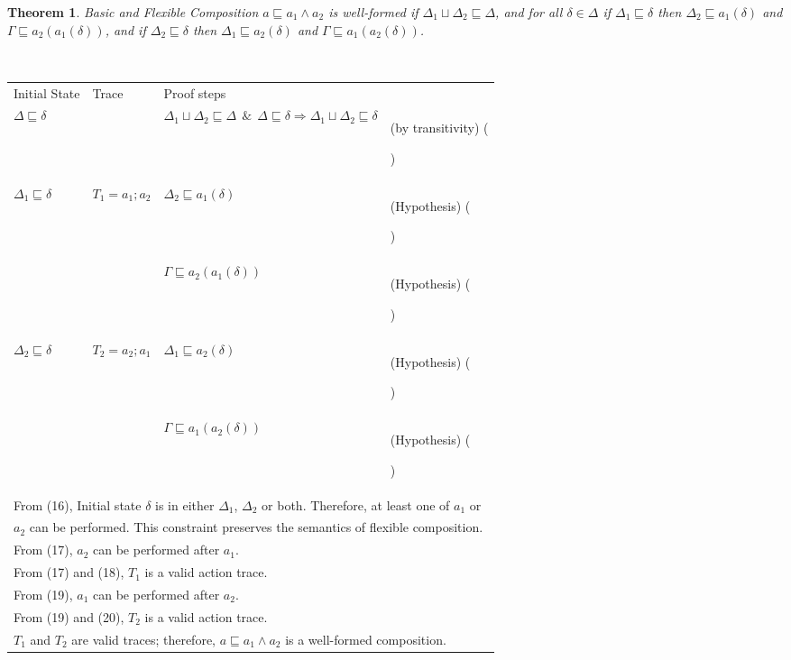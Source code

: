 \documentclass[12pt,journal,letterpaper,onecolumn]{IEEEtran}
\newcounter{myCounter}
\renewcommand{\themyCounter}{\arabic{myCounter}\addtocounter{myCounter}{1}}
\newtheorem{theorem}{Theorem}[section]
\begin{document}
\begin{theorem}
Basic and Flexible Composition $a\sqsubseteq a_1 \wedge a_2$ is
well-formed if $ \Delta_1 \sqcup \Delta_2 \sqsubseteq \Delta$, and
for all $\delta \in \Delta$ if $\Delta_1 \sqsubseteq \delta$ then $
\Delta_2 \sqsubseteq a_1(\delta)$ and $\Gamma \sqsubseteq
a_2(a_1(\delta))$, and if $ \Delta_2 \sqsubseteq \delta$ then
$\Delta_1 \sqsubseteq a_2(\delta)$ and $\Gamma \sqsubseteq
a_1(a_2(\delta))$.\label{theorem:basicflexibleconjunction}
\end{theorem}
\\
\begin{minipage}{6in} \begin{center}
\begin{tabular}{llp{7.5cm}p{3.8cm}}
Initial State & Trace &  Proof steps & \\
$\Delta \sqsubseteq \delta$ &  & $\Delta_1 \sqcup \Delta_2 \sqsubseteq \Delta ~~\&~~ \Delta \sqsubseteq \delta \Rightarrow \Delta_1 \sqcup \Delta_2 \sqsubseteq \delta$& (by transitivity) \hfill(\themyCounter) \\
$\Delta_1 \sqsubseteq \delta$ & $T_1 = a_1;a_2$ & $\Delta_2 \sqsubseteq a_1(\delta) $& (Hypothesis) \hfill(\themyCounter)\\
 & & $\Gamma \sqsubseteq a_2(a_1(\delta))$ & (Hypothesis) \hfill(\themyCounter)\\
$\Delta_2 \sqsubseteq \delta$ & $T_2 = a_2;a_1$ & $\Delta_1 \sqsubseteq a_2(\delta) $& (Hypothesis) \hfill(\themyCounter)\\
 & & $\Gamma \sqsubseteq a_1(a_2(\delta))$ & (Hypothesis) \hfill(\themyCounter)\\
\multicolumn{4}{l}{From (16), Initial state $\delta$ is in either
$\Delta_1$, $\Delta_2$ or both. Therefore, at least one of $a_1$ or}\\
\multicolumn{4}{l}{$a_2$ can be performed. This constraint preserves the semantics of flexible composition.} \\
\multicolumn{4}{l}{From (17), $a_2$ can be performed after $a_1$.} \\
\multicolumn{4}{l}{From (17) and (18), $T_1$ is a valid action trace.} \\
\multicolumn{4}{l}{From (19), $a_1$ can be performed after $a_2$.} \\
\multicolumn{4}{l}{From (19) and (20), $T_2$ is a valid action trace.} \\
\multicolumn{4}{l}{$T_1$ and $T_2$ are valid traces; therefore,
$a\sqsubseteq a_1 \wedge a_2$ is a well-formed composition.}
\hfill$\Box$
\end{tabular}
\end{center}
\end{minipage}\\
\end{document}
